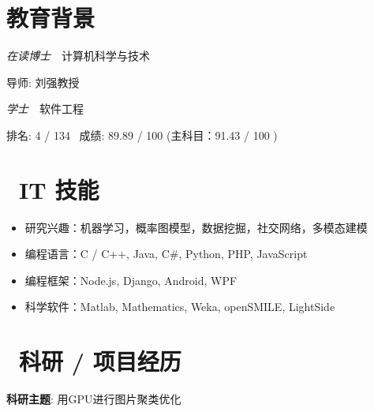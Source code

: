 \documentclass{resume}
\begin{document}


 
\section{\faGraduationCap 教育背景}

\textit{在读博士}\ \ 计算机科学与技术

导师: 刘强教授

\textit{学士}\ \ 软件工程

排名: 4 / 134 \ 成绩: 89.89 / 100 (主科目：91.43 / 100 )


\section{\faCogs\ IT 技能}
\begin{itemize}[parsep=0.5ex]
  \item 研究兴趣：机器学习，概率图模型，数据挖掘，社交网络，多模态建模
  \item 编程语言：C / C++, Java, C\#, Python, PHP, JavaScript
  \item 编程框架：Node.js, Django, Android, WPF
  \item 科学软件：Matlab, Mathematics, Weka, openSMILE, LightSide
\end{itemize}


\section{\faUsers\ 科研 / 项目经历}
\textbf{科研主题}: 用GPU进行图片聚类优化
\end{document}
